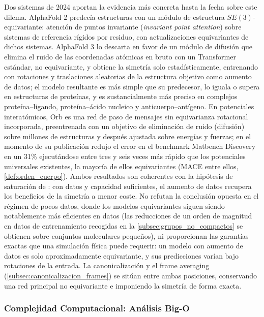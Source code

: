 Dos sistemas de 2024 aportan la evidencia más concreta hasta la fecha sobre este dilema. AlphaFold 2 predecía estructuras con un módulo de estructura $SE(3)$-equivariante: atención de puntos invariante (\textit{invariant point attention}) sobre sistemas de referencia rígidos por residuo, con actualizaciones equivariantes de dichos sistemas. AlphaFold 3 \citep{abramson2024alphafold3} lo descarta en favor de un módulo de difusión que elimina el ruido de las coordenadas atómicas en bruto con un \gls{Transformer} estándar, no equivariante, y obtiene la simetría solo estadísticamente, entrenando con rotaciones y traslaciones aleatorias de la estructura objetivo como aumento de datos; el modelo resultante es más simple que su predecesor, lo iguala o supera en estructuras de proteínas, y es sustancialmente más preciso en complejos proteína--ligando, proteína--ácido nucleico y anticuerpo--antígeno. En potenciales interatómicos, Orb \citep{neumann2024orb} es una red de paso de mensajes sin equivarianza rotacional incorporada, preentrenada con un objetivo de eliminación de ruido (difusión) sobre millones de estructuras y después ajustada sobre energías y fuerzas; en el momento de su publicación redujo el error en el benchmark Matbench Discovery en un 31\% ejecutándose entre tres y seis veces más rápido que los potenciales universales existentes, la mayoría de ellos equivariantes (MACE entre ellos, \autoref{def:orden_cuerpo}). Ambos resultados son coherentes con la hipótesis de saturación de \citet{park2024equivariancescale}: con datos y capacidad suficientes, el aumento de datos recupera los beneficios de la simetría a menor coste. No refutan la conclusión opuesta en el régimen de pocos datos, donde los modelos equivariantes siguen siendo notablemente más eficientes en datos (las reducciones de un orden de magnitud en datos de entrenamiento recogidas en la \autoref{subsec:grupos_no_compactos} se obtienen sobre conjuntos moleculares pequeños), ni proporcionan las garantías exactas que una simulación física puede requerir: un modelo con aumento de datos es solo aproximadamente equivariante, y sus predicciones varían bajo rotaciones de la entrada. La canonicalización y el frame averaging (\autoref{subsec:canonicalizacion_frames}) se sitúan entre ambas posiciones, conservando una red principal no equivariante e imponiendo la simetría de forma exacta.

\subsubsection{Complejidad Computacional: Análisis Big-O}

